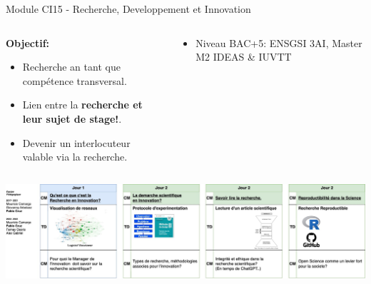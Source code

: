 \documentclass[
  11pt,
  ignorenonframetext,
  aspectratio=169,
  c]{beamer}
\providecommand{\tightlist}{%
  \setlength{\itemsep}{0pt}\setlength{\parskip}{0pt}}\usepackage{longtable,booktabs,array}
\begin{document}
\begin{frame}[t]{Module CI15 - Recherche, Developpement et Innovation}
\protect\hypertarget{module-ci15---recherche-developpement-et-innovation}{}
\begin{columns}[T]
\begin{column}[c]{0.5\textwidth}
\scriptsize

\textbf{Objectif:}

\begin{itemize}
\tightlist
\item
  Recherche an tant que compétence transversal.
\item
  Lien entre la \textbf{recherche et leur sujet de stage!}.
\item
  Devenir un interlocuteur valable via la recherche.
\end{itemize}
\end{column}

\begin{column}[c]{0.5\textwidth}
\scriptsize

\begin{itemize}
\tightlist
\item
  Niveau BAC+5: ENSGSI 3AI, Master M2 IDEAS \& IUVTT
\end{itemize}
\end{column}
\end{columns}

\includegraphics{figures/slides/Ensegnement-CI15.jpg}
\end{frame}
\end{document}
